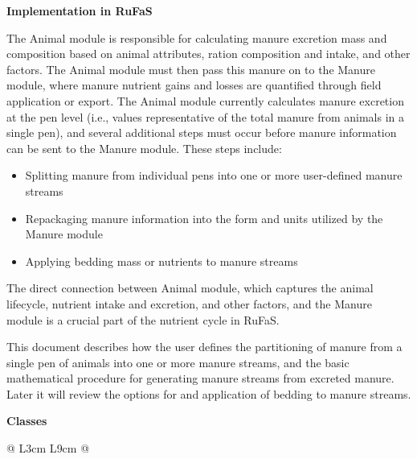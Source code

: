 \begin{refsection}
    \vspace{0.25cm}
    \textbf{Implementation in RuFaS} 
    \vspace{0.25cm}

    The Animal module is responsible for calculating manure excretion mass and composition based on animal attributes, ration composition and intake, and other factors. The Animal module must then pass this manure on to the Manure module, where manure nutrient gains and losses are quantified through field application or export. The Animal module currently calculates manure excretion at the pen level (i.e., values representative of the total manure from animals in a single pen), and several additional steps must occur before manure information can be sent to the Manure module. These steps include:
    \vspace{0.2cm}

    \begin{itemize}
        \item Splitting manure from individual pens into one or more user-defined manure streams
        \item Repackaging manure information into the form and units utilized by the Manure module
        \item Applying bedding mass or nutrients to manure streams 
    \end{itemize}
    \vspace{0.2cm}
    
    The direct connection between Animal module, which captures the animal lifecycle, nutrient intake and excretion, and other factors, and the Manure module is a crucial part of the nutrient cycle in RuFaS.

    This document describes how the user defines the partitioning of manure from a single pen of animals into one or more manure streams, and the basic mathematical procedure for generating manure streams from excreted manure. Later it will review the options for and application of bedding to manure streams.
\vspace{0.3cm}

\textbf{Classes}
\vspace{ 0.3cm}
    
    \begin{table}[h!]
    \centering
    \renewcommand{\arraystretch}{1.3}
    \caption{List of Python classes for Animal to Manure Module connection.}
    \begin{tabular}{@{} L{3cm} L{9cm}  @{}}
    \toprule


\end{tabular}
\end{table}
\end{refsection}
